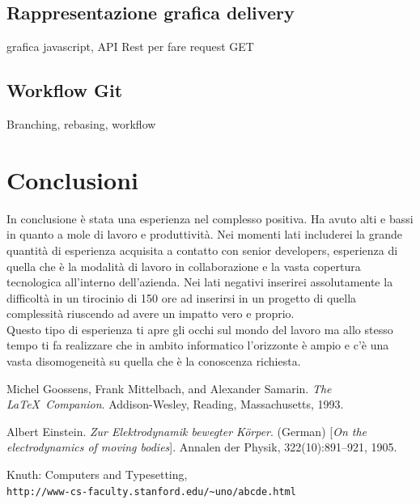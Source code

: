 \documentclass[a4paper]{article}
\begin{document}
\subsection{Rappresentazione grafica delivery}
grafica javascript, API Rest per fare request GET
\subsection{Workflow Git}
Branching, rebasing, workflow

\section{Conclusioni}
\par In conclusione è stata una esperienza nel complesso positiva. Ha avuto alti e bassi in quanto 
a mole di lavoro e produttività. Nei momenti lati includerei la grande quantità
di esperienza acquisita a contatto con senior developers, esperienza di quella che è
la modalità di lavoro in collaborazione e la vasta copertura tecnologica all'interno
dell'azienda. Nei lati negativi inserirei assolutamente la difficoltà in un tirocinio
di 150 ore ad inserirsi in un progetto di quella complessità riuscendo ad avere un 
impatto vero e proprio. \\
Questo tipo di esperienza ti apre gli occhi sul mondo del lavoro ma allo stesso tempo
ti fa realizzare che in ambito informatico l'orizzonte è ampio e c'è una vasta disomogeneità
su quella che è la conoscenza richiesta.
\renewcommand{\refname}{Bibliografia}
\begin{thebibliography}{9}
  Michel Goossens, Frank Mittelbach, and Alexander Samarin. 
  \textit{The \LaTeX\ Companion}. 
  Addison-Wesley, Reading, Massachusetts, 1993.
   
  Albert Einstein. 
  \textit{Zur Elektrodynamik bewegter K{\"o}rper}. (German) 
  [\textit{On the electrodynamics of moving bodies}]. 
  Annalen der Physik, 322(10):891–921, 1905.
   
  Knuth: Computers and Typesetting,
  \\\texttt{http://www-cs-faculty.stanford.edu/\~{}uno/abcde.html}
  \end{thebibliography}
\end{document}
